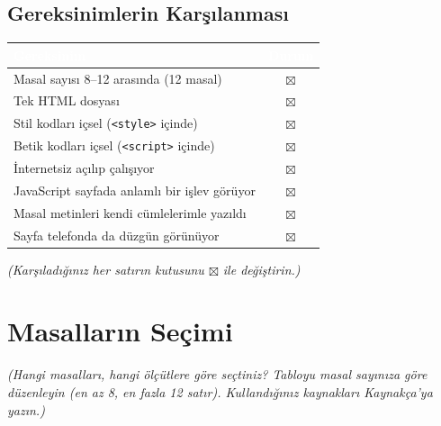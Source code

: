 \documentclass[12pt,a4paper]{article}
\newcommand{\aciklama}[1]{{\color{gray}\itshape (#1)}}
\begin{document}
\subsection{Gereksinimlerin Karşılanması}
\begin{center}
\begin{tabular}{@{}p{8.2cm}c@{}}
\toprule
\rowcolor{ana}\textcolor{white}{\textbf{Gereksinim}} & \textcolor{white}{\textbf{Durum}} \\
\midrule
Masal sayısı 8--12 arasında (12 masal)         & $\boxtimes$\\
Tek HTML dosyası                                    & $\boxtimes$ \\
Stil kodları içsel (\texttt{<style>} içinde)        & $\boxtimes$ \\
Betik kodları içsel (\texttt{<script>} içinde)      & $\boxtimes$ \\
İnternetsiz açılıp çalışıyor                        & $\boxtimes$ \\
JavaScript sayfada anlamlı bir işlev görüyor        & $\boxtimes$ \\
Masal metinleri kendi cümlelerimle yazıldı          & $\boxtimes$ \\
Sayfa telefonda da düzgün görünüyor                 & $\boxtimes$ \\
\bottomrule
\end{tabular}
\end{center}
\aciklama{Karşıladığınız her satırın kutusunu $\boxtimes$ ile değiştirin.}

\section{Masalların Seçimi}
\aciklama{Hangi masalları, hangi ölçütlere göre seçtiniz? Tabloyu masal sayınıza göre
düzenleyin (en az 8, en fazla 12 satır). Kullandığınız kaynakları Kaynakça'ya yazın.}
\end{document}
